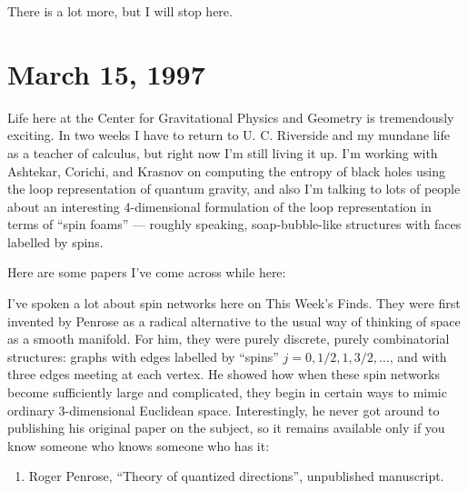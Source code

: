 \documentclass{article}
\def\tightlist{}
\renewcommand{\texttt}[1]{%
  \begingroup
  \ttfamily
  \begingroup\lccode`~=`/\lowercase{\endgroup\def~}{/\discretionary{}{}{}}%
  \begingroup\lccode`~=`[\lowercase{\endgroup\def~}{[\discretionary{}{}{}}%
  \begingroup\lccode`~=`.\lowercase{\endgroup\def~}{.\discretionary{}{}{}}%
  \catcode`/=\active\catcode`[=\active\catcode`.=\active
  \scantokens{#1\noexpand}%
  \endgroup
}
\begin{document}
There is a lot more, but I will stop here.
\hypertarget{week99}{%
\section{March 15, 1997}\label{week99}}

Life here at the Center for Gravitational Physics and Geometry is
tremendously exciting. In two weeks I have to return to U. C. Riverside
and my mundane life as a teacher of calculus, but right now I'm still
living it up. I'm working with Ashtekar, Corichi, and Krasnov on
computing the entropy of black holes using the loop representation of
quantum gravity, and also I'm talking to lots of people about an
interesting 4-dimensional formulation of the loop representation in
terms of ``spin foams'' --- roughly speaking, soap-bubble-like
structures with faces labelled by spins.

Here are some papers I've come across while here:


I've spoken a lot about spin networks here on This Week's Finds. They
were first invented by Penrose as a radical alternative to the usual way
of thinking of space as a smooth manifold. For him, they were purely
discrete, purely combinatorial structures: graphs with edges labelled by
``spins'' \(j = 0, 1/2, 1, 3/2, \ldots\), and with three edges meeting
at each vertex. He showed how when these spin networks become
sufficiently large and complicated, they begin in certain ways to mimic
ordinary 3-dimensional Euclidean space. Interestingly, he never got
around to publishing his original paper on the subject, so it remains
available only if you know someone who knows someone who has it:

\begin{enumerate}
\def\labelenumi{\arabic{enumi})}
\setcounter{enumi}{1}
\tightlist
\item
  Roger Penrose, ``Theory of quantized directions'', unpublished
  manuscript.
\end{enumerate}
\end{document}
